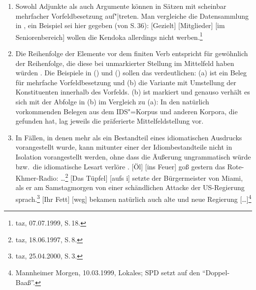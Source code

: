 \begin{enumerate}
\item Sowohl Adjunkte als auch Argumente können in Sätzen mit scheinbar mehrfacher Vorfeldbesetzung auf"|treten.
      Man vergleiche die Datensammlung in , ein Beispiel sei hier gegeben (von S.\,36):
      \ea
      {}[Gezielt] [Mitglieder] [im Seniorenbereich] wollen die Kendoka allerdings nicht
      werben.\label{bsp-gezielt-mitglieder}\footnote{
        taz, 07.07.1999, S.\,18.
      }
      \z
\item Die Reihenfolge der Elemente vor dem finiten Verb entspricht für gewöhnlich der Reihenfolge, 
      die diese bei unmarkierter Stellung im Mittelfeld haben würden 
      \parencites[--413]{Eisenberg94a}[Abschnitt~2.10]{Mueller2005d}.
      Die Beispiele in () und () sollen das verdeutlichen: (a) ist ein Beleg für mehrfache Vorfeldbesetzung
      und (b) die Variante mit Umstellung der Konstituenten innerhalb des Vorfelds.
\eal
{}
\zl
(b) ist markiert und genauso verhält es sich mit der Abfolge in (b) im Vergleich zu (a):
\eal{}
\zl
In den natürlich vorkommenden Belegen aus dem IDS"=Korpus und anderen Korpora, die
\citet{Bildhauer2011a} gefunden hat, lag jeweils die präferierte Mittelfeldstellung vor.
\item In Fällen, in denen mehr als ein Bestandteil eines idiomatischen Ausdrucks vorangestellt wurde,
      kann mitunter einer der Idiombestandteile nicht in Isolation vorangestellt werden, ohne dass die
      Äußerung ungrammatisch würde bzw.\ die idiomatische Lesart verlöre \citep[Abschnitt~2.9]{Mueller2005d}.
\eal
\ex {}[Öl] [ins Feuer] goß gestern das Rote-Khmer-Radio:
      \ldots\footnote{
        taz, 18.06.1997, S.\,8.
}
\ex{}
{}[Das Tüpfel] [aufs i] setzte der Bürgermeister von Miami, als er am Samstagmorgen von einer schändlichen 
Attacke der US-Regierung sprach.\footnote{
        taz, 25.04.2000, S.\,3. %
    }
\ex {}[Ihr Fett] [weg] bekamen natürlich auch alte und neue Regierung [\ldots]\footnote{
        Mannheimer Morgen, 10.03.1999, Lokales; SPD setzt auf den "`Doppel-Baaß"'. %
      }
\zl
\eal
{}
\zl
\end{enumerate}
